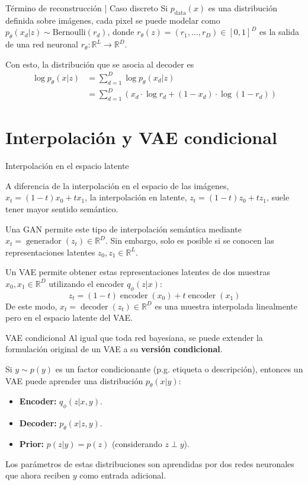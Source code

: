 \documentclass{beamer}
\newcommand{\R}{\mathbb{R}}
\begin{document}
\begin{frame}{Término de reconstrucción | Caso discreto}
    Si $p_\text{data}(x)$ es una distribución definida sobre imágenes, cada pixel se puede modelar como $p_\theta(x_d|z)\sim \text{Bernoulli}\left(r_d\right)$, donde $r_\theta(z)=(r_1,\ldots,r_D)\in[0,1]^D$ es la salida de una red neuronal $r_\theta:\R^L\to\R^D$.

    Con esto, la distribución que se asocia al decoder es
    \begin{align*}
        \log p_\theta(x|z)
         & = \sum_{d=1}^D \log p_\theta(x_d|z)                                     \\
         & = \sum_{d=1}^D \left(x_d\cdot\log r_d + (1-x_d)\cdot\log(1-r_d)\right)
    \end{align*}
\end{frame}

\section{Interpolación y VAE condicional}

\begin{frame}{Interpolación en el espacio latente}

    A diferencia de la interpolación en el espacio de las imágenes, $x_t=(1-t)x_0+tx_1$, la interpolación en latente, $z_t=(1-t)z_0+tz_1$, suele tener mayor sentido semántico.

    Una GAN permite este tipo de interpolación semántica mediante $x_t=\operatorname{generador}(z_t)\in\R^D$. Sin embargo, solo es posible si se conocen las representaciones latentes $z_0,z_1\in\R^L$.

    Un VAE permite obtener estas representaciones latentes de dos muestras $x_0,x_1\in\R^D$ utilizando el encoder $q_\phi(z|x)$:
    \begin{equation*}
        z_t=(1-t)\operatorname{encoder}(x_0)+t\operatorname{encoder}(x_1)
    \end{equation*}
    De este modo, $x_t=\operatorname{decoder}(z_t)\in\R^D$ es una muestra interpolada linealmente pero en el espacio latente del VAE.
\end{frame}

\begin{frame}{VAE condicional}
    Al igual que toda red bayesiana, se puede extender la formulación original de un VAE a su \textbf{versión condicional}.

    Si $y\sim p(y)$ es un factor condicionante (p.g. etiqueta o descripción), entonces un VAE puede aprender una distribución $p_\theta(x|y)$:
    \vspace{-0.5cm}
    \begin{itemize}
        \item \textbf{Encoder:} $q_\phi(z|x,y)$.
        \item \textbf{Decoder:} $p_\theta(x|z,y)$.
        \item \textbf{Prior:} $p(z|y)=p(z)$ (considerando $z\perp y$).
    \end{itemize}
    Los parámetros de estas distribuciones son aprendidas por dos redes neuronales que ahora reciben $y$ como entrada adicional.
\end{frame}
\end{document}
